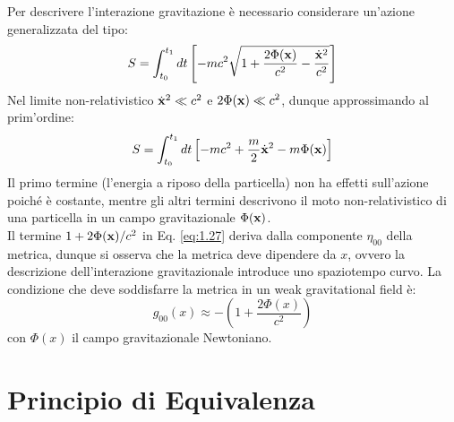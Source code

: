 Per descrivere l'interazione gravitazione è necessario considerare un'azione generalizzata del tipo:
\begin{equation}
  S = \int_{t_0}^{t_1} dt \left[ -mc^2 \sqrt{1 + \frac{2\Phi(\mathbf{x})}{c^2} - \frac{\dot{\mathbf{x}}^2}{c^2}} \right]
  \label{eq:1.27}
\end{equation}
Nel limite non-relativistico $ \dot{\mathbf{x}}^2 \ll c^2 $ e $ 2\Phi(\mathbf{x}) \ll c^2 $, dunque approssimando al prim'ordine:
\begin{equation}
  S = \int_{t_0}^{t_1} dt \left[ -mc^2 + \frac{m}{2}\dot{\mathbf{x}}^2 - m\Phi(\mathbf{x}) \right]
  \label{eq:1.28}
\end{equation}
Il primo termine (l'energia a riposo della particella) non ha effetti sull'azione poiché è costante, mentre gli altri termini descrivono il moto non-relativistico di una particella in un campo gravitazionale $ \Phi(\mathbf{x}) $.\\
Il termine $ 1 + 2\Phi(\mathbf{x})/c^2 $ in Eq. \ref{eq:1.27} deriva dalla componente $ \eta_{00} $ della metrica, dunque si osserva che la metrica deve dipendere da $ x $, ovvero la descrizione dell'interazione gravitazionale introduce uno spaziotempo curvo. La condizione che deve soddisfarre la metrica in un weak gravitational field è:
\begin{equation}
  g_{00}(x) \approx - \left( 1 + \frac{2\Phi(x)}{c^2} \right)
  \label{eq:1.29}
\end{equation}
con $ \Phi(x) $ il campo gravitazionale Newtoniano.

\section{Principio di Equivalenza}

